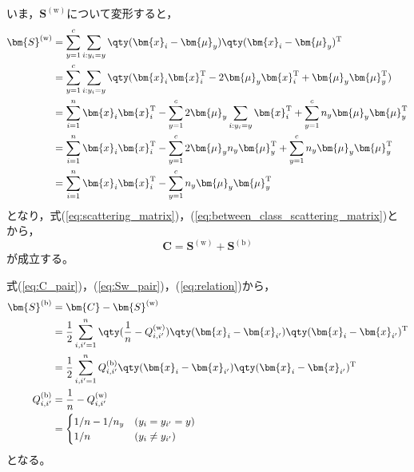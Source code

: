 \documentclass[class=jsarticle, crop=false, dvipdfmx, fleqn]{standalone}
\begin{document}
いま，\(\bm{S}^\mathrm{(w)}\)について変形すると，
\begin{align*}
    \bm{S}^\mathrm{(w)}
        & = \sum_{y=1}^{c} \sum_{i: y_i=y} \qty(\bm{x}_i - \bm{\mu}_y) \qty(\bm{x}_i - \bm{\mu}_y)^\mathrm{T} \\
        & = \sum_{y=1}^{c} \sum_{i: y_i=y} \qty(\bm{x}_i \bm{x}_i^\mathrm{T} - 2 \bm{\mu}_y \bm{x}_i^\mathrm{T} + \bm{\mu}_y \bm{\mu}_y^\mathrm{T}) \\
        & = \sum_{i=1}^{n} \bm{x}_i \bm{x}_i^\mathrm{T} - \sum_{y=1}^{c} 2 \bm{\mu}_y \sum_{i: y_i=y} \bm{x}_i^\mathrm{T} + \sum_{y=1}^{c} n_y \bm{\mu}_y \bm{\mu}_y^\mathrm{T} \\
        & = \sum_{i=1}^{n} \bm{x}_i \bm{x}_i^\mathrm{T} - \sum_{y=1}^{c} 2 \bm{\mu}_y n_y \bm{\mu}_y^\mathrm{T} + \sum_{y=1}^{c} n_y \bm{\mu}_y \bm{\mu}_y^\mathrm{T} \\
        & = \sum_{i=1}^{n} \bm{x}_i \bm{x}_i^\mathrm{T} - \sum_{y=1}^{c} n_y \bm{\mu}_y \bm{\mu}_y^\mathrm{T}
\end{align*}
となり，式(\ref{eq:scattering_matrix})，(\ref{eq:between_class_scattering_matrix})とから，
\begin{equation}
    \bm{C} = \bm{S}^\mathrm{(w)} + \bm{S}^\mathrm{(b)}
    \label{eq:relation}
\end{equation}
が成立する。

式(\ref{eq:C_pair})，(\ref{eq:Sw_pair})，(\ref{eq:relation})から，
\begin{align}
    \bm{S}^\mathrm{(b)}
        & = \bm{C} - \bm{S}^\mathrm{(w)} \notag \\
        & = \frac{1}{2} \sum_{i, i'=1}^{n} \qty(\frac{1}{n} - Q_{i, i'}^\mathrm{(w)}) \qty(\bm{x}_i - \bm{x}_{i'}) \qty(\bm{x}_i - \bm{x}_{i'})^\mathrm{T} \notag \\
        & = \frac{1}{2} \sum_{i, i'=1}^{n} Q_{i, i'}^\mathrm{(b)} \qty(\bm{x}_i - \bm{x}_{i'}) \qty(\bm{x}_i - \bm{x}_{i'})^\mathrm{T}
        \label{eq:Sb_pair} \\
    Q_{i, i'}^\mathrm{(b)}
        & = \frac{1}{n} - Q_{i, i'}^\mathrm{(w)} \notag \\
        & =
            \begin{cases}
                1/n - 1/n_y & (y_i = y_{i'} = y) \\
                1/n & (y_i \neq y_{i'})
            \end{cases}
        \label{eq:Qb}
\end{align}
となる。
\end{document}
